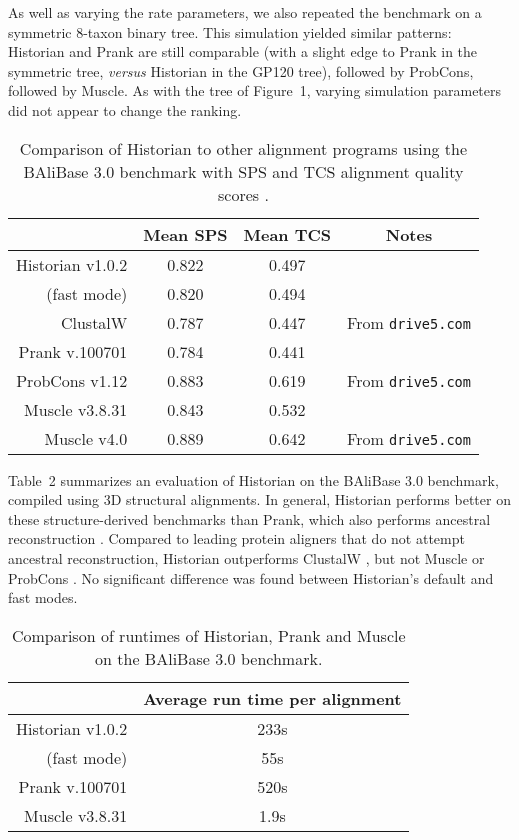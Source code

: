 As well as varying the rate parameters,
we also repeated the benchmark on a symmetric 8-taxon binary tree.
This simulation yielded similar patterns:
Historian and Prank are still comparable (with a slight edge to Prank in the
symmetric tree, {\em versus} Historian in the GP120 tree),
followed by ProbCons, followed by Muscle.
As with the tree of Figure~1,
varying simulation parameters did not appear to change the ranking.

\begin{table}
  \begin{tabular}{r|ccc}
    & Mean SPS & Mean TCS & Notes \\
    \hline
    Historian v1.0.2 & 0.822 & 0.497 & \\
    (fast mode) & 0.820 & 0.494 & \\
ClustalW & 0.787 & 0.447 & From {\tt drive5.com} \\
Prank v.100701 & 0.784 & 0.441 \\
ProbCons v1.12 & 0.883 & 0.619 & From {\tt drive5.com} \\
Muscle v3.8.31 & 0.843 & 0.532 & \\
Muscle v4.0 & 0.889 & 0.642 &  From {\tt drive5.com}
  \end{tabular}
  \caption{
    Comparison of Historian to other alignment programs using the BAliBase 3.0 benchmark
    with SPS and TCS alignment quality scores \citep{ThompsonEtAl2005}.
  }
\end{table}

Table~2 summarizes an evaluation of Historian
on the BAliBase 3.0 benchmark,
compiled using 3D structural alignments.
%
In general, Historian performs better on these structure-derived benchmarks than Prank,
which also performs ancestral reconstruction \citep{LoytynojaGoldman2008}.
Compared to leading protein aligners that do not attempt ancestral reconstruction,
Historian outperforms ClustalW \citep{LarkinEtAl2007}, but not Muscle \citep{Edgar2004b}
or ProbCons \citep{DoEtAl2005}. %
No significant difference was found between Historian's default and fast modes.

\begin{table}
  \begin{tabular}{r|c}
    & Average run time per alignment \\
    \hline
Historian v1.0.2 & 233s \\
 (fast mode) & 55s \\
Prank v.100701 & 520s \\
Muscle v3.8.31 & 1.9s \\
\end{tabular}
\caption{
    Comparison of runtimes of Historian, Prank and Muscle on the BAliBase 3.0 benchmark.
  }
\end{table}

